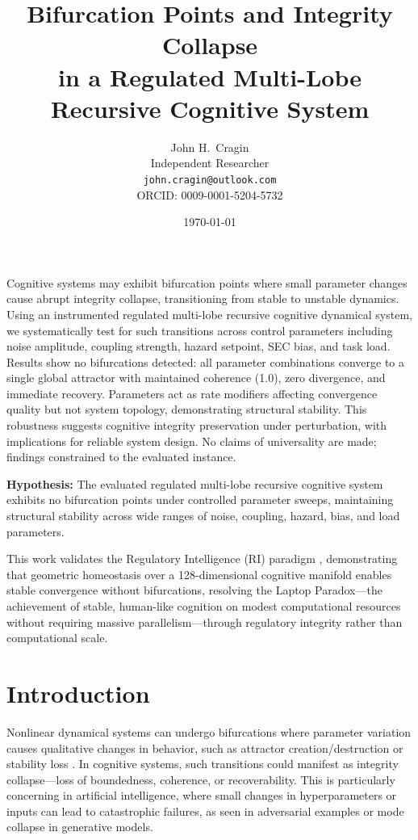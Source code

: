 \documentclass[11pt,a4paper]{article}
\title{Bifurcation Points and Integrity Collapse \\
\Large in a Regulated Multi-Lobe Recursive Cognitive System}
\author{
John H.~Cragin\\
Independent Researcher\\
\texttt{john.cragin@outlook.com}\\
ORCID: 0009-0001-5204-5732
}
\date{\today}
\begin{document}
\maketitle


Cognitive systems may exhibit bifurcation points where small parameter changes cause abrupt integrity collapse, transitioning from stable to unstable dynamics. Using an instrumented regulated multi-lobe recursive cognitive dynamical system, we systematically test for such transitions across control parameters including noise amplitude, coupling strength, hazard setpoint, SEC bias, and task load. Results show no bifurcations detected: all parameter combinations converge to a single global attractor with maintained coherence (1.0), zero divergence, and immediate recovery. Parameters act as rate modifiers affecting convergence quality but not system topology, demonstrating structural stability. This robustness suggests cognitive integrity preservation under perturbation, with implications for reliable system design. No claims of universality are made; findings constrained to the evaluated instance.

\begin{tcolorbox}
\textbf{Hypothesis:} The evaluated regulated multi-lobe recursive cognitive system exhibits no bifurcation points under controlled parameter sweeps, maintaining structural stability across wide ranges of noise, coupling, hazard, bias, and load parameters.
\end{tcolorbox}

This work validates the Regulatory Intelligence (RI) paradigm \cite{Cragin2026RI}, demonstrating that geometric homeostasis over a 128-dimensional cognitive manifold enables stable convergence without bifurcations, resolving the Laptop Paradox—the achievement of stable, human-like cognition on modest computational resources without requiring massive parallelism—through regulatory integrity rather than computational scale.


\section{Introduction}

Nonlinear dynamical systems can undergo bifurcations where parameter variation causes qualitative changes in behavior, such as attractor creation/destruction or stability loss \cite{Strogatz2018}. In cognitive systems, such transitions could manifest as integrity collapse—loss of boundedness, coherence, or recoverability. This is particularly concerning in artificial intelligence, where small changes in hyperparameters or inputs can lead to catastrophic failures, as seen in adversarial examples or mode collapse in generative models.
\end{document}
